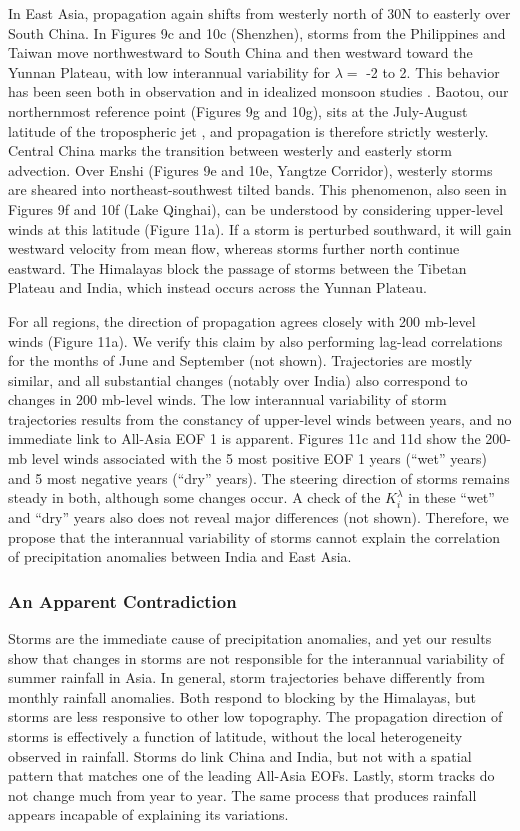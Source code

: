 \documentclass[12pt]{article}
\begin{document}
	 In East Asia, propagation again shifts from westerly north of 30\textdegree N to easterly over South China. In Figures 9c and 10c (Shenzhen), storms from the Philippines and Taiwan move northwestward to South China and then westward toward the Yunnan Plateau, with low interannual variability for $\lambda =$ -2 to 2. This behavior has been seen both in observation \citep{Chen1999} and in idealized monsoon studies \citep{Prive2007a}. Baotou, our northernmost reference point (Figures 9g and 10g), sits at the July-August latitude of the tropospheric jet \citep{Schiemann2009}, and propagation is therefore strictly westerly. Central China marks the transition between westerly and easterly storm advection. Over Enshi (Figures 9e and 10e, Yangtze Corridor), westerly storms are sheared into northeast-southwest tilted bands. This phenomenon, also seen in Figures 9f and 10f (Lake Qinghai), can be understood by considering upper-level winds at this latitude (Figure 11a). If a storm is perturbed southward, it will gain westward velocity from mean flow, whereas storms further north continue eastward. The Himalayas block the passage of storms between the Tibetan Plateau and India, which instead occurs across the Yunnan Plateau.
	 
	 For all regions, the direction of propagation agrees closely with 200 mb-level winds (Figure 11a). We verify this claim by also performing lag-lead correlations for the months of June and September (not shown). Trajectories are mostly similar, and all substantial changes (notably over India) also correspond to changes in 200 mb-level winds. The low interannual variability of storm trajectories results from the constancy of upper-level winds between years, and no immediate link to All-Asia EOF 1 is apparent. Figures 11c and 11d show the 200-mb level winds associated with the 5 most positive EOF 1 years (``wet'' years) and 5 most negative years (``dry'' years). The steering direction of storms remains steady in both, although some changes occur. A check of the $K_i^\lambda$ in these ``wet'' and ``dry'' years also does not reveal major differences (not shown). Therefore, we propose that the interannual variability of storms cannot explain the correlation of precipitation anomalies between India and East Asia.
	 
\subsubsection{An Apparent Contradiction}
	 
	 Storms are the immediate cause of precipitation anomalies, and yet our results show that changes in storms are not responsible for the interannual variability of summer rainfall in Asia. In general, storm trajectories behave differently from monthly rainfall anomalies. Both respond to blocking by the Himalayas, but storms are less responsive to other low topography. The propagation direction of storms is effectively a function of latitude, without the local heterogeneity observed in rainfall. Storms do link China and India, but not with a spatial pattern that matches one of the leading All-Asia EOFs. Lastly, storm tracks do not change much from year to year. The same process that produces rainfall appears incapable of explaining its variations.
	 
\end{document}
